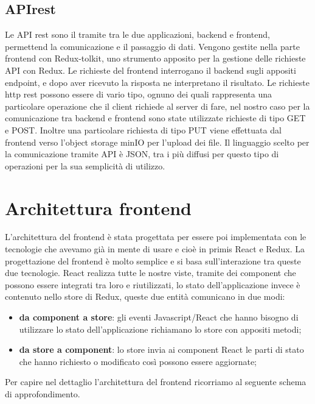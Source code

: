 \subsection{APIrest}
Le API rest sono il tramite tra le due applicazioni, backend e frontend, permettend la comunicazione e il passaggio di dati. Vengono gestite nella parte frontend con Redux-tolkit,
uno strumento apposito per la gestione delle richieste API con Redux.
Le richieste del frontend interrogano il backend sugli appositi endpoint, e dopo aver ricevuto la risposta ne interpretano il risultato. Le richieste http rest possono essere di vario tipo,
ognuno dei quali rappresenta una particolare operazione che il client richiede al server di fare, nel nostro caso per la comunicazione tra backend e frontend sono state utilizzate richieste
di tipo GET e POST. Inoltre una particolare richiesta di tipo PUT viene effettuata dal frontend verso l'object storage minIO per l'upload dei file. Il linguaggio scelto per la comunicazione
tramite API è JSON, tra i più diffusi per questo tipo di operazioni per la sua semplicità di utilizzo.

\section{Architettura frontend}
L'architettura del frontend è stata progettata per essere poi implementata con le tecnologie che avevamo già in mente di usare e cioè in primis React e Redux. La progettazione del
frontend è molto semplice e si basa sull'interazione tra queste due tecnologie. React realizza tutte le nostre viste, tramite dei component che possono essere integrati tra loro
e riutilizzati, lo stato dell'applicazione invece è contenuto nello store di Redux, queste due entità comunicano in due modi:
\begin{itemize}
  \item \textbf{da component a store}: gli eventi Javascript/React che hanno bisogno di utilizzare lo stato dell'applicazione richiamano lo store con appositi metodi;
  \item \textbf{da store a component}: lo store invia ai component React le parti di stato che hanno richiesto o modificato così possono essere aggiornate;
\end{itemize}

Per capire nel dettaglio l'architettura del frontend ricorriamo al seguente schema di approfondimento.

